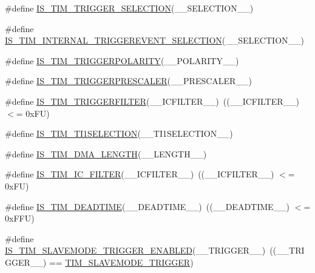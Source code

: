 \begin{DoxyCompactItemize}
\item 
\#define \hyperlink{group___t_i_m___private___macros_ga31d479d785a28d48bd66fdca38b48d91}{I\+S\+\_\+\+T\+I\+M\+\_\+\+T\+R\+I\+G\+G\+E\+R\+\_\+\+S\+E\+L\+E\+C\+T\+I\+ON}(\+\_\+\+\_\+\+S\+E\+L\+E\+C\+T\+I\+O\+N\+\_\+\+\_\+)
\item 
\#define \hyperlink{group___t_i_m___private___macros_ga48eee98612db56131414fdacc7a5743d}{I\+S\+\_\+\+T\+I\+M\+\_\+\+I\+N\+T\+E\+R\+N\+A\+L\+\_\+\+T\+R\+I\+G\+G\+E\+R\+E\+V\+E\+N\+T\+\_\+\+S\+E\+L\+E\+C\+T\+I\+ON}(\+\_\+\+\_\+\+S\+E\+L\+E\+C\+T\+I\+O\+N\+\_\+\+\_\+)
\item 
\#define \hyperlink{group___t_i_m___private___macros_ga4389836fe0783c8661deb7b7d58dd217}{I\+S\+\_\+\+T\+I\+M\+\_\+\+T\+R\+I\+G\+G\+E\+R\+P\+O\+L\+A\+R\+I\+TY}(\+\_\+\+\_\+\+P\+O\+L\+A\+R\+I\+T\+Y\+\_\+\+\_\+)
\item 
\#define \hyperlink{group___t_i_m___private___macros_gac38c7d0c59f17b5a6d9ff01b82ddae43}{I\+S\+\_\+\+T\+I\+M\+\_\+\+T\+R\+I\+G\+G\+E\+R\+P\+R\+E\+S\+C\+A\+L\+ER}(\+\_\+\+\_\+\+P\+R\+E\+S\+C\+A\+L\+E\+R\+\_\+\+\_\+)
\item 
\#define \hyperlink{group___t_i_m___private___macros_gab1d40d533bb6edb9920f682ab8b4f96a}{I\+S\+\_\+\+T\+I\+M\+\_\+\+T\+R\+I\+G\+G\+E\+R\+F\+I\+L\+T\+ER}(\+\_\+\+\_\+\+I\+C\+F\+I\+L\+T\+E\+R\+\_\+\+\_\+)~((\+\_\+\+\_\+\+I\+C\+F\+I\+L\+T\+E\+R\+\_\+\+\_\+) $<$= 0x\+F\+U)
\item 
\#define \hyperlink{group___t_i_m___private___macros_ga6198cc86401c7b2ca26f5074847cda13}{I\+S\+\_\+\+T\+I\+M\+\_\+\+T\+I1\+S\+E\+L\+E\+C\+T\+I\+ON}(\+\_\+\+\_\+\+T\+I1\+S\+E\+L\+E\+C\+T\+I\+O\+N\+\_\+\+\_\+)
\item 
\#define \hyperlink{group___t_i_m___private___macros_ga58ca64223d434407d8e83ab34dd39f79}{I\+S\+\_\+\+T\+I\+M\+\_\+\+D\+M\+A\+\_\+\+L\+E\+N\+G\+TH}(\+\_\+\+\_\+\+L\+E\+N\+G\+T\+H\+\_\+\+\_\+)
\item 
\#define \hyperlink{group___t_i_m___private___macros_ga3844dc9afbc0894bf6ba16f1d3cb656c}{I\+S\+\_\+\+T\+I\+M\+\_\+\+I\+C\+\_\+\+F\+I\+L\+T\+ER}(\+\_\+\+\_\+\+I\+C\+F\+I\+L\+T\+E\+R\+\_\+\+\_\+)~((\+\_\+\+\_\+\+I\+C\+F\+I\+L\+T\+E\+R\+\_\+\+\_\+) $<$= 0x\+F\+U)
\item 
\#define \hyperlink{group___t_i_m___private___macros_ga223fe03967fab834c92f4159fa2e2817}{I\+S\+\_\+\+T\+I\+M\+\_\+\+D\+E\+A\+D\+T\+I\+ME}(\+\_\+\+\_\+\+D\+E\+A\+D\+T\+I\+M\+E\+\_\+\+\_\+)~((\+\_\+\+\_\+\+D\+E\+A\+D\+T\+I\+M\+E\+\_\+\+\_\+) $<$= 0x\+F\+F\+U)
\item 
\#define \hyperlink{group___t_i_m___private___macros_ga44d4f84407e34dbd1ac3ccba12684975}{I\+S\+\_\+\+T\+I\+M\+\_\+\+S\+L\+A\+V\+E\+M\+O\+D\+E\+\_\+\+T\+R\+I\+G\+G\+E\+R\+\_\+\+E\+N\+A\+B\+L\+ED}(\+\_\+\+\_\+\+T\+R\+I\+G\+G\+E\+R\+\_\+\+\_\+)~((\+\_\+\+\_\+\+T\+R\+I\+G\+G\+E\+R\+\_\+\+\_\+) == \hyperlink{group___t_i_m___slave___mode_ga12f8f7b4a16b438f54cf811f0bb0a8a4}{T\+I\+M\+\_\+\+S\+L\+A\+V\+E\+M\+O\+D\+E\+\_\+\+T\+R\+I\+G\+G\+ER})

\end{DoxyCompactItemize}
